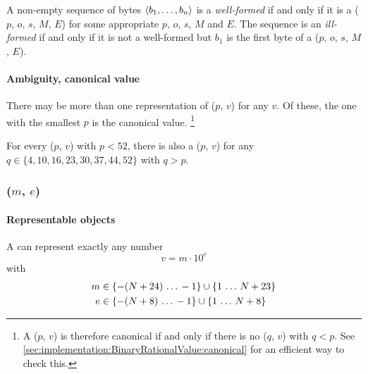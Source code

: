 A non-empty sequence of bytes $\langle b_1, \ldots, b_n \rangle$ is a \emph{well-formed}
 if and only if
it is a ($p$, $o$, $s$, $M$, $E$) for some
appropriate $p$, $o$, $s$, $M$ and $E$.
The sequence is an \emph{ill-formed}  if and only if it is not a well-formed
 but $b_1$ is the first byte of a
($p$, $o$, $s$, $M$, $E$).

\paragraph{Ambiguity, canonical value}

There may be more than one representation of ($p$, $v$) for any $v$.
Of these, the one with the smallest $p$ is the canonical value.%
\footnote{
    A ($p$, $v$) is therefore canonical if and only if there is
    no ($q$, $v$) with $q < p$.
    See \ref{sec:implementation:BinaryRationalValue:canonical} for an efficient way to check this.
}

For every ($p$, $v$) with $p < 52$, there is also
a ($p$, $v$) for any
$q \in \{4, 10, 16, 23, 30, 37, 44, 52\}$ with $q > p$.


\subsubsection{($m$, $e$)}
\hypertarget{sec:def:DecimalRationalValue}{}

\paragraph{Representable objects}

A  can represent exactly any number
\begin{equation}
    v = m \cdot 10^e
\end{equation}
with
\begin{align*}
    m & \in \{-(N + 24) \,\ldots\, -1\} \cup \{1 \,\ldots\, N + 23\} \\
    e & \in \{-(N + 8) \,\ldots\, -1\} \cup \{1 \,\ldots\, N + 8\}
\end{align*}

